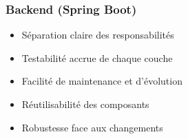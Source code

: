 \documentclass[10pt]{article}
\begin{document}
\vspace{0.8cm}

\subsubsection{Backend (Spring Boot)}


\begin{minipage}{\textwidth}
    \begin{minipage}{0.48\textwidth}
        \begin{secondarybox}[title=Couches applicatives]
        \end{secondarybox}
    \end{minipage}
    \hfill
    \begin{minipage}{0.48\textwidth}
        \begin{tcolorbox}[
            enhanced,
            colback=secondary!5,
            colframe=secondary,
            arc=5pt,
            title=Avantages de cette architecture,
            fonttitle=\small\bfseries\sffamily\color{white},
            coltitle=white,
            colbacktitle=secondary
        ]
            \begin{itemize}[leftmargin=12pt, itemsep=2pt, font=\small\sffamily]
                \item Séparation claire des responsabilités
                \item Testabilité accrue de chaque couche
                \item Facilité de maintenance et d'évolution
                \item Réutilisabilité des composants
                \item Robustesse face aux changements
            \end{itemize}
        \end{tcolorbox}
    \end{minipage}
\end{minipage}

\vspace{0.5cm}
\end{document}
